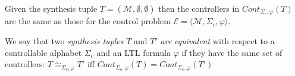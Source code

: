 \begin{remark}
Given the synthesis tuple $T = (\mathcal{M}, \emptyset, \emptyset)$ then the controllers in $Cont_{\Sigma_c, \varphi}(T)$ are the same as those for the control problem  $\mathcal{E} = \langle \mathcal{M}, \Sigma_c, \varphi \rangle$.
\end{remark}


We say that two \textit{synthesis tuples} $T$ and $T'$ \textit{are }\textit{equivalent} with respect to a controllable alphabet $\Sigma_c$ and an LTL formula $\varphi$ if they have the same set of controllers: $T \cong_{\Sigma_c, \varphi} T'$ iff $Cont_{\Sigma_c, \varphi}(T) = Cont_{\Sigma_c, \varphi}(T')$





